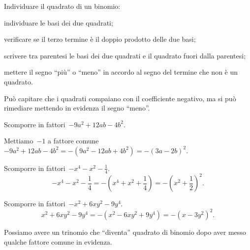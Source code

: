 \begin{procedura}
Individuare il quadrato di un binomio:
\begin{enumeratea}
\item individuare le basi dei due quadrati;
\item verificare se il terzo termine è il doppio prodotto delle due basi;
\item scrivere tra parentesi le basi dei due quadrati e il quadrato fuori dalla parentesi;
\item mettere il segno ``più'' o ``meno'' in accordo al segno del termine che non è un quadrato.
\end{enumeratea}
\end{procedura}
\pagebreak
Può capitare che i quadrati compaiano con il coefficiente negativo, ma si può rimediare mettendo in evidenza il segno ``meno''.

\begin{exrig}
 \begin{esempio}
Scomporre in fattori~$-9a^{2}+12{ab}-4b^{2}$.

Mettiamo~$-1$ a fattore comune~$-9a^{2}+12ab-4b^{2}=-(9a^{2}-12{ab}+4b^{2})=-(3a-2b)^{2}$.
 \end{esempio}

 \begin{esempio}
Scomporre in fattori~$-x^{4}-x^{2}-\frac{1}{4}$.
\[-x^{4}-x^{2}-\frac{1}{4}=-\left(x^{4}+x^{2}+\frac{1}{4}\right)=-\left(x^{2}+\frac{1}{2}\right)^{2}.\]
 \end{esempio}

 \begin{esempio}
Scomporre in fattori~$-x^{2}+6xy^{2}-9y^{4}$.
\[x^{2}+6xy^{2}-9y^{4}=-\left(x^{2}-6xy^{2}+9y^{4}\right)=-\left(x-3y^{2}\right)^{2}.\]
 \end{esempio}
\end{exrig}

Possiamo avere un trinomio che ``diventa'' quadrato di binomio dopo aver messo qualche fattore comune in evidenza.

